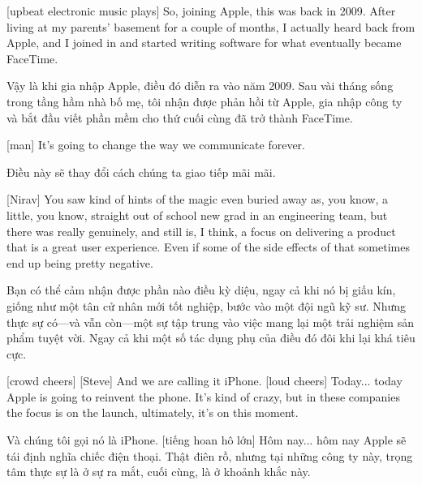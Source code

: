 \documentclass[a4paper]{article}
\begin{document}
	
	[upbeat electronic music plays]
	So, joining Apple, this was back in 2009.
	After living at my parents' basement for a couple of months, I actually heard back from Apple, and I joined in and started writing software for what eventually became FaceTime.
	
	\begin{vietnamese-v2}
		Vậy là khi gia nhập Apple, điều đó diễn ra vào năm 2009. 
		Sau vài tháng sống trong tầng hầm nhà bố mẹ, tôi nhận được phản hồi từ Apple, gia nhập công ty và bắt đầu viết phần mềm cho thứ cuối cùng đã trở thành FaceTime.
	\end{vietnamese-v2}
	
	[man] It's going to change the way we communicate forever.
	
	\begin{vietnamese-v2}
		 Điều này sẽ thay đổi cách chúng ta giao tiếp mãi mãi.
	\end{vietnamese-v2}
	
	[Nirav] You saw kind of hints of the magic even buried away as, you know, a little, you know, straight out of school new grad in an engineering team, but there was really genuinely, and still is, I think, a focus on delivering a product that is a great user experience.
	Even if some of the side effects of that sometimes end up being pretty negative.
	
	\begin{vietnamese-v2}
		[Nirav] Bạn có thể cảm nhận được phần nào điều kỳ diệu, ngay cả khi nó bị giấu kín, giống như một tân cử nhân mới tốt nghiệp, bước vào một đội ngũ kỹ sư. Nhưng thực sự có—và vẫn còn—một sự tập trung vào việc mang lại một trải nghiệm sản phẩm tuyệt vời. Ngay cả khi một số tác dụng phụ của điều đó đôi khi lại khá tiêu cực.
	\end{vietnamese-v2}
	
	
	[crowd cheers]
	[Steve] And we are calling it iPhone.
	[loud cheers]
	Today...
	today Apple is going to reinvent the phone.
	It's kind of crazy, but in these companies the focus is on the launch, ultimately, it's on this moment.
	
	\begin{vietnamese-v2}
		 Và chúng tôi gọi nó là iPhone.  
		[tiếng hoan hô lớn]  
		Hôm nay...  
		hôm nay Apple sẽ tái định nghĩa chiếc điện thoại.  
		Thật điên rồ, nhưng tại những công ty này, trọng tâm thực sự là ở sự ra mắt, cuối cùng, là ở khoảnh khắc này.
	\end{vietnamese-v2}
	
\end{document}
